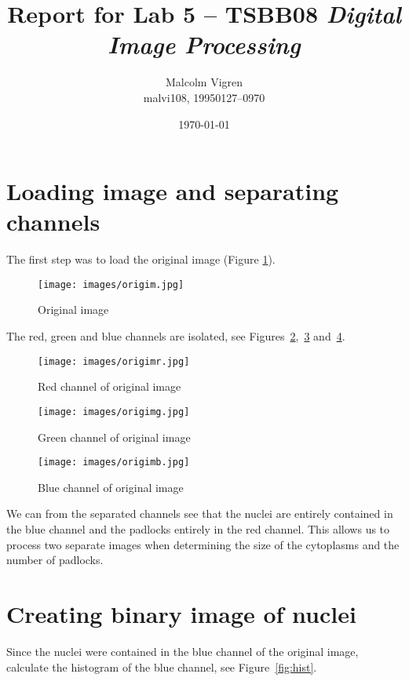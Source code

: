 \documentclass[twocolumn]{article}
\title{Report for Lab 5 -- TSBB08 \emph{Digital Image Processing}}
\author{Malcolm Vigren \\ malvi108, 19950127--0970 }
\date{\today}
\begin{document}
\maketitle

\section{Loading image and separating channels}

The first step was to load the original image (Figure \ref{fig:origim}).

\begin{figure}[h!]
    \centering
    \texttt{[image: images/origim.jpg]}
    \caption{Original image}
    \label{fig:origim}
\end{figure}

The red, green and blue channels are isolated, see
Figures~\ref{fig:origimr},~\ref{fig:origimg} and~\ref{fig:origimb}.

\begin{figure}[h!]
    \centering
    \texttt{[image: images/origimr.jpg]}
    \caption{Red channel of original image}
    \label{fig:origimr}
\end{figure}

\begin{figure}[h!]
    \centering
    \texttt{[image: images/origimg.jpg]}
    \caption{Green channel of original image}
    \label{fig:origimg}
\end{figure}

\begin{figure}[h!]
    \centering
    \texttt{[image: images/origimb.jpg]}
    \caption{Blue channel of original image}
    \label{fig:origimb}
\end{figure}

We can from the separated channels see that the nuclei are entirely contained
in the blue channel and the padlocks entirely in the red channel. This allows
us to process two separate images when determining the size of the cytoplasms
and the number of padlocks.

\section{Creating binary image of nuclei}

Since the nuclei were contained in the blue channel of the original image,
calculate the histogram of the blue channel, see Figure~\ref{fig:hist}.
\end{document}
